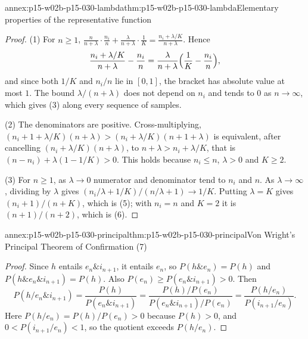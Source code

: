 \begin{annexitem}{annex:p15-w02b-p15-030-lambda}{thm:p15-w02b-p15-030-lambda}{Elementary properties of the representative function}
\begin{proof}
(1) For \(n\geq1\),
\(\frac{n}{n+\lambda}\cdot\frac{n_i}{n}+\frac{\lambda}{n+\lambda}\cdot\frac1K
=\frac{n_i+\lambda/K}{n+\lambda}\). Hence
\[
 \frac{n_i+\lambda/K}{n+\lambda}-\frac{n_i}{n}
 =\frac{\lambda}{n+\lambda}\Bigl(\frac1K-\frac{n_i}{n}\Bigr),
\]
and since both \(1/K\) and \(n_i/n\) lie in \([0,1]\), the bracket has
absolute value at most \(1\). The bound \(\lambda/(n+\lambda)\) does not depend
on \(n_i\) and tends to \(0\) as \(n\to\infty\), which gives (3) along every
sequence of samples.

(2) The denominators are positive. Cross-multiplying,
\((n_i+1+\lambda/K)(n+\lambda)>(n_i+\lambda/K)(n+1+\lambda)\) is equivalent,
after cancelling \((n_i+\lambda/K)(n+\lambda)\), to
\(n+\lambda>n_i+\lambda/K\), that is \((n-n_i)+\lambda(1-1/K)>0\). This holds
because \(n_i\leq n\), \(\lambda>0\) and \(K\geq2\).

(3) For \(n\geq1\), as \(\lambda\to0\) numerator and denominator tend to
\(n_i\) and \(n\). As \(\lambda\to\infty\), dividing by \(\lambda\) gives
\((n_i/\lambda+1/K)/(n/\lambda+1)\to1/K\). Putting \(\lambda=K\) gives
\((n_i+1)/(n+K)\), which is (5); with \(n_i=n\) and \(K=2\) it is
\((n+1)/(n+2)\), which is (6).
\end{proof}
\end{annexitem}

\begin{annexitem}{annex:p15-w02b-p15-030-principal}{thm:p15-w02b-p15-030-principal}{Von Wright's Principal Theorem of Confirmation (7)}
\begin{proof}
Since \(h\) entails \(e_n\&i_{n+1}\), it entails \(e_n\), so
\(P(h\&e_n)=P(h)\) and \(P(h\&e_n\&i_{n+1})=P(h)\). Also
\(P(e_n)\geq P(e_n\&i_{n+1})>0\). Then
\[
 P(h/e_n\&i_{n+1})=\frac{P(h)}{P(e_n\&i_{n+1})}
 =\frac{P(h)/P(e_n)}{P(e_n\&i_{n+1})/P(e_n)}
 =\frac{P(h/e_n)}{P(i_{n+1}/e_n)}.
\]
Here \(P(h/e_n)=P(h)/P(e_n)>0\) because \(P(h)>0\), and
\(0<P(i_{n+1}/e_n)<1\), so the quotient exceeds \(P(h/e_n)\).
\end{proof}
\end{annexitem}

